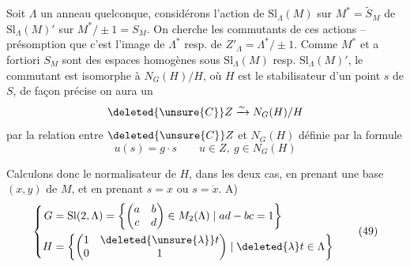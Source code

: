  Soit $\Lambda$ un anneau quelconque, 
considérons l'action de $\mathrm{Sl}_\Lambda(M)$ sur $M^*=\widetilde S_M$
de $\mathrm{Sl}_\Lambda(M)'$ sur $M^*/\pm1=S_M$. On cherche
les commutants de ces actions --  
présomption que c'est l'image de $\Lambda^*$
resp. de $Z'_\Lambda=\Lambda^*/\pm1$. Comme $M^*$ et a
fortiori  $S_M$  sont des espaces homogènes
sous  $\mathrm{Sl}_\Lambda(M)$ resp. $\mathrm{Sl}_\Lambda(M)'$, le commutant
 est isomorphe à $N_G(H)/H$, où $H$ est
le stabilisateur d'un point $s$ de $S$, de
façon précise on aura un 
\[
\deleted{\unsure{C}}Z\xrightarrow{\sim}N_G(H)/H
\]
par la relation entre $\deleted{\unsure{C}}Z$ et $N_G(H)$
définie par la formule
\[
u(s)=g\cdot s\qquad u\in Z,\ g\in N_G(H)\tag*{(48)}
\]

Calculons donc le normalisateur de
$H$, dans les deux cas, en prenant une base
$(x,y)$ de $M$, et en prenant $s=x$ ou $s=\dot x$.
A)
\[
\left\{\begin{aligned}
G&=\mathrm{Sl}(2,\Lambda)=\left\{\begin{pmatrix}a&b\\c&d\end{pmatrix}\in M_2(\Lambda)\mid ad-bc=1\right\}\\
H&=\left\{\begin{pmatrix}1&\deleted{\unsure{\lambda}}t\\0&1\end{pmatrix}\mid\deleted{\lambda}t\in\Lambda\right\}
\end{aligned}\right.\tag*{(49)}
\]

